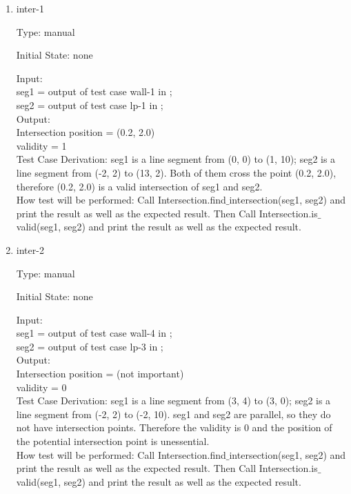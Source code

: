 \documentclass[12pt, titlepage]{article}
\begin{document}
\begin{enumerate}

\item{inter-1\\}

Type: manual
					
Initial State: none
					
Input: \\
seg1 = output of test case wall-1 in ;\\
seg2 = output of test case lp-1 in ;\\
					
Output: \\
Intersection position = (0.2, 2.0)\\
validity = 1\\

Test Case Derivation: seg1 is a line segment from (0, 0) to (1, 10); seg2 is a line segment from (-2, 2) to (13, 2). Both of them cross the point (0.2, 2.0), therefore (0.2, 2.0) is a valid intersection of seg1 and seg2.\\

How test will be performed: Call Intersection.find$\_$intersection(seg1, seg2) and print the result
as well as the expected result. Then Call Intersection.is$\_$valid(seg1, seg2) and print the result
as well as the expected result.

\item{inter-2\\}

Type: manual
					
Initial State: none
					
Input: \\
seg1 = output of test case wall-4 in ;\\
seg2 = output of test case lp-3 in ;\\
					
Output: \\
Intersection position = (not important)\\
validity = 0\\

Test Case Derivation: seg1 is a line segment from (3, 4) to (3, 0); seg2 is a line segment from (-2, 2) to (-2, 10). seg1 and seg2 are parallel, so they do not have intersection points. Therefore the validity is 0 and the position of the potential intersection point is unessential.\\

How test will be performed: Call Intersection.find$\_$intersection(seg1, seg2) and print the result
as well as the expected result. Then Call Intersection.is$\_$valid(seg1, seg2) and print the result
as well as the expected result.


\end{enumerate}
\end{document}
